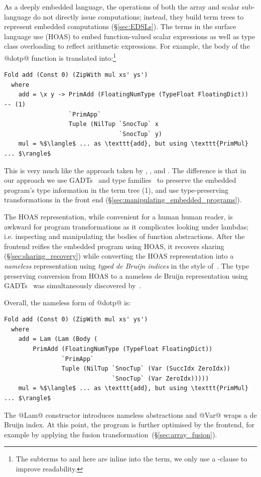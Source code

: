 As a deeply embedded language, the operations of both the array and scalar
sub-language do not directly issue computations; instead, they build term trees
to represent embedded computations (\S\ref{sec:EDSLs}). The terms in the surface
language use  (HOAS) to embed
function-valued scalar expressions as well as type class overloading to reflect
arithmetic expressions. For example, the body of the @dotp@ function
is translated into:\footnote{The subterms to  and 
here are inline into the term, we only use a -clause to improve
readability.}
%
\begin{lstlisting}[style=haskell]
  Fold add (Const 0) (ZipWith mul xs' ys')
  where
    add = \x y -> PrimAdd (FloatingNumType (TypeFloat FloatingDict))               -- (1)
                  `PrimApp`
                  Tuple (NilTup `SnocTup` x
                                `SnocTup` y)
    mul = %$\langle$ ... as \texttt{add}, but using \texttt{PrimMul} ... $\rangle$
\end{lstlisting}
%
This is very much like the approach taken by \citet{Elliott:2004hh},
\citet{Gill:2011wy}, and \citet{Mainland:2010vj}. The difference is that in our
approach we use GADTs~\cite{Jones:2006eh} and type
families~\cite{Chakravarty:2005dx,Schrijvers:2008ir} to preserve the embedded
program's type information in the term tree (1), and use type-preserving
transformations in the front end (\S\ref{sec:manipulating_embedded_programs}).

The HOAS representation, while convenient for a human human reader, is awkward
for program transformations as it complicates looking under lambdas; i.e.
inspecting and manipulating the bodies of function abstractions. After the
frontend reifies the embedded program using HOAS, it recovers sharing
(\S\ref{sec:sharing_recovery}) while converting the HOAS representation into a
\emph{nameless} representation using \emph{typed de Bruijn indices} in the style
of~\citet{Altenkirch:2003kz}. The type preserving conversion from HOAS to a
nameless de Bruijn representation using GADTs~\cite{Chakravarty:2009uo} was
simultaneously discovered by~\citet{Atkey:2009dj}.

Overall, the nameless form of @dotp@ is:
%
\begin{lstlisting}[style=haskell]
  Fold add (Const 0) (ZipWith mul xs' ys')
  where
    add = Lam (Lam (Body (
        PrimAdd (FloatingNumType (TypeFloat FloatingDict))
                `PrimApp`
                Tuple (NilTup `SnocTup` (Var (SuccIdx ZeroIdx))
                              `SnocTup` (Var ZeroIdx)))))
    mul = %$\langle$ ... as \texttt{add}, but using \texttt{PrimMul} ... $\rangle$
\end{lstlisting}
%
The @Lam@ constructor introduces nameless abstractions and @Var@ wraps a de
Bruijn index. At this point, the program is further optimised by the frontend,
for example by applying the fusion transformation~(\S\ref{sec:array_fusion}).

